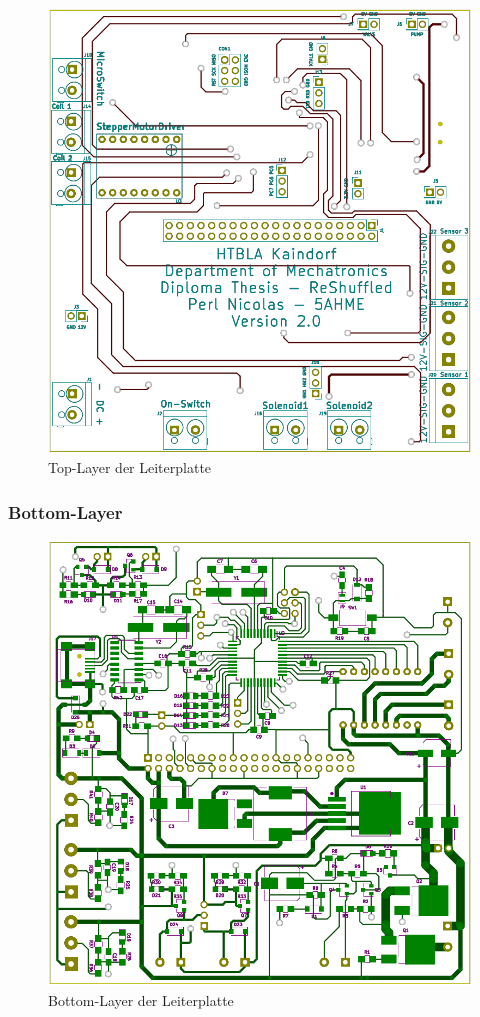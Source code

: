 \begin{figure}[hbt]
    \centering
    \includegraphics[scale=0.28]{fig/elektro/TopLayer.png}
    \caption{Top-Layer der Leiterplatte}
\end{figure}

\subsubsection{Bottom-Layer}

\begin{figure}[hbt]
    \centering
    \includegraphics[scale=0.28]{fig/elektro/BotLayer.png}
    \caption{Bottom-Layer der Leiterplatte}
\end{figure}

